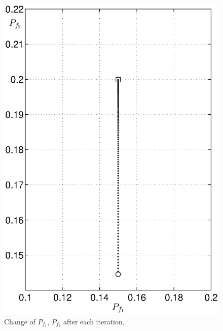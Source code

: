 \begin{figure}[H]
\centering
\includegraphics[width = 14cm]{2/152pf.eps}
\caption{Change of $P_{f_1}$, $P_{f_2}$ after each iteration.}
\label{fig: 2.3}
\end{figure}
\newpage
